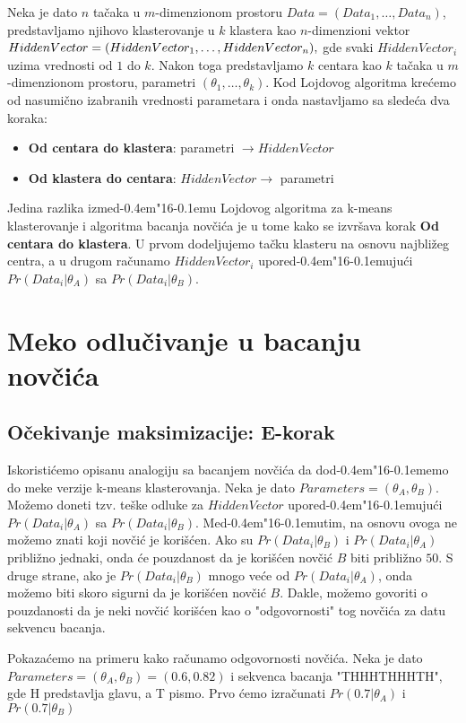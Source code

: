 \documentclass[a4paper]{book}
\def \dj {d\kern-0.4em\char"16\kern-0.1em}
\begin{document}
Neka je dato $n$ tačaka u $m$-dimenzionom prostoru $Data = (Data_1,\dots, Data_n)$, predstavljamo njihovo klasterovanje u $k$ klastera kao $n$-dimenzioni vektor $HiddenVector = (HiddenVector_1,\dots, \\ HiddenVector_n ),$ gde svaki $HiddenVector_i$ uzima vrednosti od $1$ do $k$. Nakon toga predstavljamo $k$ centara kao $k$ tačaka u $m$-dimenzionom prostoru, parametri $(\theta_1,\dots,\theta_k)$. Kod Lojdovog algoritma krećemo od nasumično izabranih vrednosti parametara i onda nastavljamo sa sledeća dva koraka:
\begin{itemize}
    \item \textbf{Od centara do klastera}: parametri $\rightarrow HiddenVector$
    \item \textbf{Od klastera do centara}: $HiddenVector \rightarrow $ parametri 
\end{itemize}

Jedina razlika izme\dj u Lojdovog algoritma za k-means klasterovanje i algoritma bacanja novčića je u tome kako se izvršava korak \textbf{Od centara do klastera}. U prvom dodeljujemo tačku klasteru na osnovu najbližeg centra, a u drugom računamo $HiddenVector_i$ upore\dj ujući $Pr(Data_i|\theta_A)$ sa $Pr(Data_i|\theta_B)$.

\section{Meko odlučivanje u bacanju novčića} %
\subsection{Očekivanje maksimizacije: E-korak}

Iskoristićemo opisanu analogiju sa bacanjem novčića da do\dj emo do meke verzije k-means klasterovanja. Neka je dato $Parameters = (\theta_A, \theta_B)$. Možemo doneti tzv. teške odluke za $HiddenVector$ upore\dj ujući $Pr(Data_i|\theta_A)$ sa $Pr(Data_i|\theta_B)$. Me\dj utim, na osnovu ovoga ne možemo znati koji novčić je korišćen. Ako su $Pr(Data_i|\theta_B)$ i $Pr(Data_i|\theta_A)$ približno jednaki, onda će pouzdanost da je korišćen novčić $B$ biti približno $50$. S druge strane, ako je $Pr(Data_i|\theta_B)$ mnogo veće od $Pr(Data_i|\theta_A)$, onda možemo biti skoro sigurni da je korišćen novčić $B$.
Dakle, možemo govoriti o pouzdanosti da je neki novčić korišćen kao o "odgovornosti" tog novčića za datu sekvencu bacanja. 

Pokazaćemo na primeru kako računamo odgovornosti novčića. Neka je dato $Parameters = (\theta_A, \theta_B) = (0.6, 0.82)$ i sekvenca bacanja "THHHTHHHTH", gde H predstavlja glavu, a T pismo. Prvo ćemo izračunati $Pr(0.7|\theta_A)$ i $Pr(0.7|\theta_B)$
    
\end{document}
